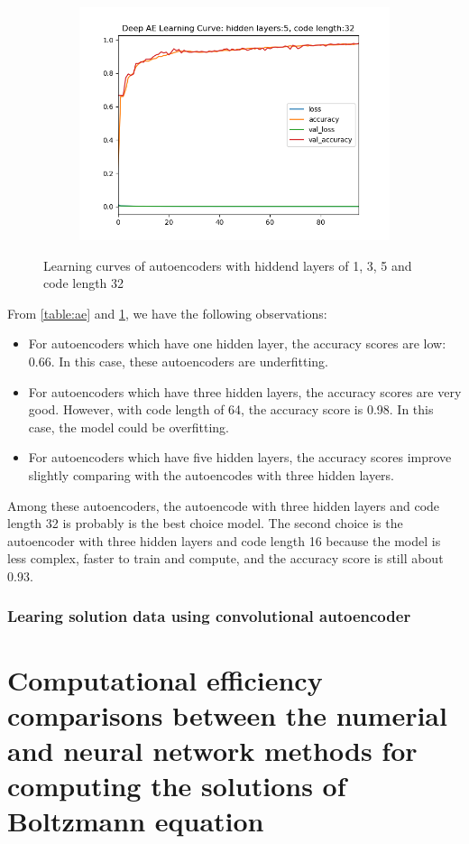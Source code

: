 \documentclass{article}
\begin{document}
\begin{figure}[h]
\begin{subfigure}{.5\textwidth}
\includegraphics[width=.75\linewidth]{LearingCurve-HL5-CL32.png}
\end{subfigure}
\caption{Learning curves of autoencoders with hiddend layers of 1, 3, 5 and code length 32 }
\label{fig:lc}
\end{figure}
\noindent From \ref{table:ae} and \ref{fig:lc}, we have the following observations:
\begin{itemize}
	\item For autoencoders which have one hidden layer, the accuracy scores are low: 0.66. In this case, these autoencoders are underfitting.
	\item For autoencoders which have three hidden layers, the accuracy scores are very good. However, with code length of 64, the accuracy score is 0.98. In this case, the model could be overfitting.
	\item For autoencoders which have five hidden layers, the accuracy scores improve slightly comparing with the autoencodes with three hidden layers. 
\end{itemize}
Among these autoencoders, the autoencode with three hidden layers and code length 32 is probably is the best choice model. The second choice is the autoencoder with three hidden layers and code length 16 because the model is less complex, faster to train and compute, and the accuracy score is still about 0.93.

\subsubsection{Learing solution data using convolutional autoencoder}

\section{Computational efficiency comparisons between the numerial and neural network methods for computing the solutions of Boltzmann equation } \label{Comparisons}
\end{document}
